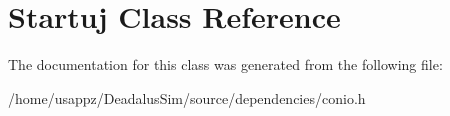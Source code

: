 \hypertarget{classStartuj}{\section{\-Startuj \-Class \-Reference}
\label{classStartuj}
}


\-The documentation for this class was generated from the following file\-:\begin{DoxyCompactItemize}
\item 
/home/usappz/\-Deadalus\-Sim/source/dependencies/conio.\-h\end{DoxyCompactItemize}
